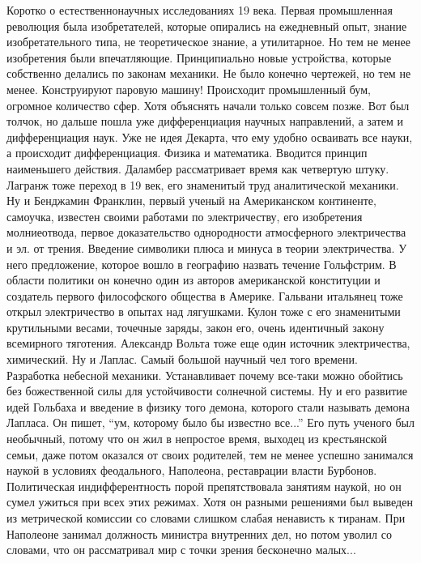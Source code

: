 \documentclass[a4paper, 12pt]{article}
\begin{document}
Коротко о естественнонаучных исследованиях 19 века. Первая промышленная 
революция была изобретателей, которые опирались на ежедневный опыт, 
знание изобретательного типа, не теоретическое знание, а утилитарное. Но 
тем не менее изобретения были впечатляющие. Принципиально новые 
устройства, которые собственно делались по законам механики. Не было 
конечно чертежей, но тем не менее. Конструируют паровую машину! 
Происходит промышленный бум, огромное количество сфер. Хотя объяснять 
начали только совсем позже. Вот был толчок, но дальше пошла уже 
дифференциация научных направлений, а затем и дифференциация наук. Уже 
не идея Декарта, что ему удобно осваивать все науки, а происходит 
дифференциация. Физика и математика. Вводится принцип наименьшего 
действия. Даламбер рассматривает время как четвертую штуку. Лагранж тоже 
переход в 19 век, его знаменитый труд аналитической механики. Ну 
и Бенджамин Франклин, первый ученый на Американском континенте, 
самоучка, известен своими работами по электричеству, его изобретения 
молниеотвода, первое доказательство однородности атмосферного 
электричества и эл. от трения. Введение символики плюса и минуса 
в теории электричества. У него предложение, которое вошло в географию 
назвать течение Гольфстрим. В области политики он конечно один из 
авторов американской конституции и создатель первого философского 
общества в Америке. Гальвани итальянец тоже открыл электричество 
в опытах над лягушками. Кулон тоже с его знаменитыми крутильными весами, 
точечные заряды, закон его, очень идентичный закону всемирного 
тяготения. Александр Вольта тоже еще один источник электричества, 
химический. Ну и Лаплас. Самый большой научный чел того времени. 
Разработка небесной механики. Устанавливает почему все-таки можно 
обойтись без божественной силы для устойчивости солнечной системы. Ну 
и его развитие идей Гольбаха и введение в физику того демона, которого 
стали называть демона Лапласа. Он пишет, ``ум, которому было бы известно 
все...'' Его путь ученого был необычный, потому что он жил в непростое 
время, выходец из крестьянской семьи, даже потом оказался от своих 
родителей, тем не менее успешно занимался наукой в условиях феодального, 
Наполеона, реставрации власти Бурбонов. Политическая индифферентность 
порой препятствовала занятиям наукой, но он сумел ужиться при всех этих 
режимах. Хотя он разными решениями был выведен из метрической комиссии 
со словами слишком слабая ненависть к тиранам. При Наполеоне занимал 
должность министра внутренних дел, но потом уволил со словами, что он 
рассматривал мир с точки зрения бесконечно малых...
\end{document}
